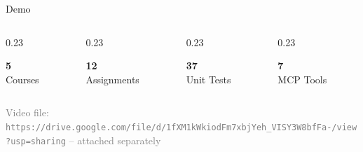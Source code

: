 \documentclass[10pt,aspectratio=169]{beamer}
\begin{document}
{\begin{frame}{Demo}
    \vspace{8pt}
    \begin{columns}[T]
        \begin{column}{0.23\textwidth}
            \begin{center}
                {\Huge \textcolor{accentblue}{\textbf{5}}} \\[2pt]
                \small Courses
            \end{center}
        \end{column}
        \begin{column}{0.23\textwidth}
            \begin{center}
                {\Huge \textcolor{accentgreen}{\textbf{12}}} \\[2pt]
                \small Assignments
            \end{center}
        \end{column}
        \begin{column}{0.23\textwidth}
            \begin{center}
                {\Huge \textcolor{accentorange}{\textbf{37}}} \\[2pt]
                \small Unit Tests
            \end{center}
        \end{column}
        \begin{column}{0.23\textwidth}
            \begin{center}
                {\Huge \textcolor{accentred}{\textbf{7}}} \\[2pt]
                \small MCP Tools
            \end{center}
        \end{column}
    \end{columns}

    \vspace{4pt}
    \begin{center}
        \footnotesize \textcolor{gray}{Video file: \texttt{https://drive.google.com/file/d/1fXM1kWkiodFm7xbjYeh_VISY3W8bfFa-/view?usp=sharing} -- attached separately}
    \end{center}
\end{frame}
}
\end{document}
